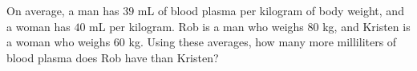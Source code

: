 On average, a man has $39$ mL of blood plasma per kilogram of body weight, and a woman has $40$ mL per kilogram. Rob is a man who weighs $80$ kg, and Kristen is a woman who weighs $60$ kg. Using these averages, how many more milliliters of blood plasma does Rob have than Kristen?
